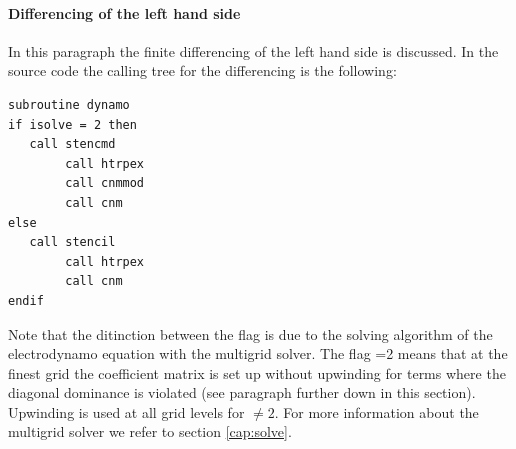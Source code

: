 \paragraph{Differencing of the left hand side}
%
In this paragraph the finite differencing of the left hand side is
discussed. In the source code the calling tree for the differencing is the
following:
%
\begin{verbatim}
subroutine dynamo
if isolve = 2 then
   call stencmd
        call htrpex
        call cnmmod
        call cnm
else
   call stencil
        call htrpex
        call cnm
endif
\end{verbatim}
%
Note that the ditinction between the flag  is due to the
solving algorithm of the electrodynamo equation with the multigrid
solver. The flag  =2 means that at the finest grid the
coefficient matrix is set up without upwinding for terms where
the diagonal dominance is violated (see paragraph further down in this section). Upwinding
is used at all grid levels for $ \neq 2$. For more information
about the multigrid solver we refer to section \ref{cap:solve}. \\
 
